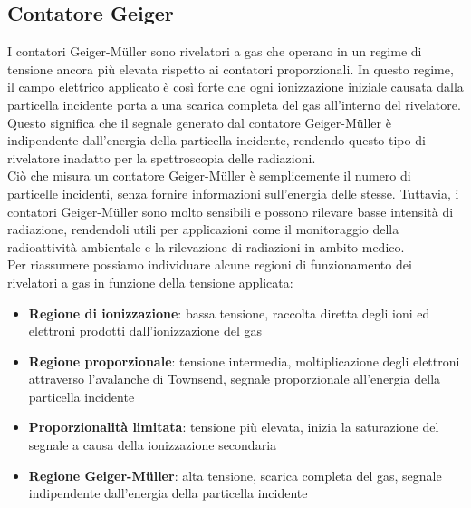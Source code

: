 \subsection{Contatore Geiger}
I contatori Geiger-Müller sono rivelatori a gas che operano in un regime di tensione ancora più elevata rispetto ai contatori proporzionali. In questo regime, il campo elettrico applicato è così forte che ogni ionizzazione iniziale causata dalla particella incidente porta a una scarica completa del gas all'interno del rivelatore. Questo significa che il segnale generato dal contatore Geiger-Müller è indipendente dall'energia della particella incidente, rendendo questo tipo di rivelatore inadatto per la spettroscopia delle radiazioni.\\
Ciò che misura un contatore Geiger-Müller è semplicemente il numero di particelle incidenti, senza fornire informazioni sull'energia delle stesse. Tuttavia, i contatori Geiger-Müller sono molto sensibili e possono rilevare basse intensità di radiazione, rendendoli utili per applicazioni come il monitoraggio della radioattività ambientale e la rilevazione di radiazioni in ambito medico.\\
Per riassumere possiamo individuare alcune regioni di funzionamento dei rivelatori a gas in funzione della tensione applicata:
\begin{itemize}
    \item \textbf{Regione di ionizzazione}: bassa tensione, raccolta diretta degli ioni ed elettroni prodotti dall'ionizzazione del gas
    \item \textbf{Regione proporzionale}: tensione intermedia, moltiplicazione degli elettroni attraverso l'avalanche di Townsend, segnale proporzionale all'energia della particella incidente
    \item \textbf{Proporzionalità limitata}: tensione più elevata, inizia la saturazione del segnale a causa della ionizzazione secondaria
    \item \textbf{Regione Geiger-Müller}: alta tensione, scarica completa del gas, segnale indipendente dall'energia della particella incidente
\end{itemize}

